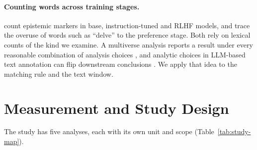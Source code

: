 \documentclass[11pt]{article}
\newif\ifpivot
\begin{document}
\paragraph{Counting words across training stages.}
\citet{zhou2024relying} count epistemic markers in base, instruction-tuned
and RLHF models, and \citet{juzek2025delve} trace the overuse of words such as
``delve'' to the preference stage. Both rely on lexical counts of the kind we
examine. A multiverse analysis reports a result under every reasonable
combination of analysis choices \citep{steegen2016multiverse}, and analytic
choices in LLM-based text annotation can flip downstream conclusions
\citep{baumann2025hacking}. We apply that
idea to the matching rule and the text window.

\section{Measurement and Study Design}

The study has \ifpivot seven\else five\fi{} analyses, each with its own unit and scope
(Table~\ref{tab:study-map}).
\end{document}

